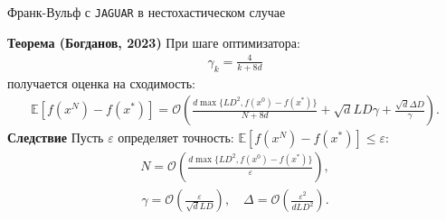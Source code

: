 \documentclass{beamer}
\begin{document}



    
        


\begin{frame}{Франк-Вульф с \texttt{JAGUAR} в нестохастическом случае}

    \textbf{Теорема (Богданов, 2023)} При шаге оптимизатора:
    \begin{align*}
        \gamma_k = \frac{4}{k + 8d}
    \end{align*}  
    получается оценка на сходимость:
    \small{
        \begin{align*}
            \mathbb{E} \left[ f(x^{N}) - f(x^*) \right] = \mathcal{O} \left( \frac{d \max\{L D^2, f(x^0) - f(x^*)\}}{N + 8d} + \sqrt{d} L D \gamma + \frac{\sqrt{d} \Delta D}{\gamma}\right).
            \end{align*}
    }
    \textbf{Следствие} Пусть $\varepsilon$ определяет точность: $\mathbb{E} \left[f(x^N) - f(x^*) \right] \leq \varepsilon$:
    \begin{align*}
        N = \mathcal{O} \left( \frac{d \max\{L D^2, f(x^0) - f(x^*)\}}{\varepsilon} \right),
    \end{align*}
    \begin{align*}
        \gamma = \mathcal{O} \left(\frac{\varepsilon}{\sqrt{d} L D} \right), \quad
        \Delta = \mathcal{O} \left( \frac{\varepsilon^2}{d L D^2}\right).
    \end{align*}

\end{frame}
\end{document}
